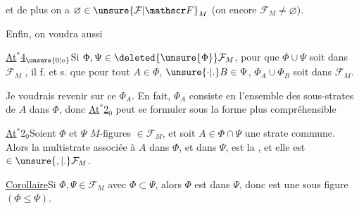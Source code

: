 et de plus on a $\varnothing\in\unsure{\mathcal F|\mathscr F}_M$ (ou encore $\mathcal F_M\neq\varnothing$).

Enfin, on voudra aussi

\uline{At$^{*}$4}$_{\unsure{0|o}}$\quad Si $\Phi,\Psi\in\deleted{\unsure{\Phi}}\mathcal F_M$, pour que $\Phi\cup\Psi$ soit  dans $\mathcal F_M$ , il f. et s. que pour tout $A\in\Phi$, $\unsure{\cdot|.}B\in\Psi$, $\Phi_A\cup\Phi_B$ soit dans $\mathcal F_M$.

Je voudrais revenir sur ce $\Phi_A$. En fait, $\Phi_A$ consiste en l'ensemble des sous-strates de $A$ dans $\Phi$, donc \uline{At$^{*}$2}$_0$ peut se formuler sous la forme plus compréhensible

\uline{At$^{*}$}2$_0$\quad Soient $\Phi$ et $\Psi$  $M$-figures $\in\mathcal F_M$, et soit $A\in\Phi\cap\Psi$ une strate commune. Alors la multistrate associée à $A$ dans $\Phi$, et dans $\Psi$, est la , et elle est $\in\unsure{,|.}\mathcal F_M$.

\uline{Corollaire}\quad Si $\Phi,\Psi\in\mathcal F_M$ avec $\Phi\subset\Psi$, alors $\Phi$ est  dans $\Psi$, donc est une sous figure $(\Phi\leq\Psi)$.
